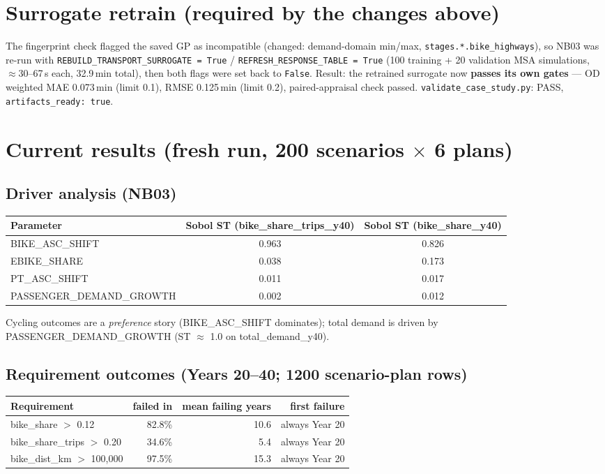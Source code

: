 \documentclass[10pt,a4paper]{article}
\begin{document}
\section{Surrogate retrain (required by the changes above)}
The fingerprint check flagged the saved GP as incompatible (changed: demand-domain
min/max, \texttt{stages.*.bike\_highways}), so NB03 was re-run with
\texttt{REBUILD\_TRANSPORT\_SURROGATE = True} / \texttt{REFRESH\_RESPONSE\_TABLE = True}
(100 training + 20 validation MSA simulations, $\approx$30--67\,s each, 32.9\,min total),
then both flags were set back to \texttt{False}. Result: the retrained surrogate now
\textbf{passes its own gates} --- OD weighted MAE 0.073\,min (limit 0.1), RMSE 0.125\,min
(limit 0.2), paired-appraisal check passed. \texttt{validate\_case\_study.py}: PASS,
\texttt{artifacts\_ready: true}.

\section{Current results (fresh run, 200 scenarios $\times$ 6 plans)}

\subsection{Driver analysis (NB03)}
\begin{center}\small\begin{tabular}{@{}lcc@{}}
\toprule
Parameter & Sobol ST (bike\_share\_trips\_y40) & Sobol ST (bike\_share\_y40) \\
\midrule
BIKE\_ASC\_SHIFT & 0.963 & 0.826 \\
EBIKE\_SHARE & 0.038 & 0.173 \\
PT\_ASC\_SHIFT & 0.011 & 0.017 \\
PASSENGER\_DEMAND\_GROWTH & 0.002 & 0.012 \\
\bottomrule
\end{tabular}\end{center}

Cycling outcomes are a \emph{preference} story (BIKE\_ASC\_SHIFT dominates); total demand
is driven by PASSENGER\_DEMAND\_GROWTH (ST $\approx$ 1.0 on total\_demand\_y40).

\subsection{Requirement outcomes (Years 20--40; 1200 scenario-plan rows)}
\begin{center}\small\begin{tabular}{@{}lrrr@{}}
\toprule
Requirement & failed in & mean failing years & first failure \\
\midrule
bike\_share ${>}$ 0.12 & 82.8\% & 10.6 & always Year 20 \\
bike\_share\_trips ${>}$ 0.20 & 34.6\% & 5.4 & always Year 20 \\
bike\_dist\_km ${>}$ 100{,}000 & 97.5\% & 15.3 & always Year 20 \\
\bottomrule
\end{tabular}\end{center}
\end{document}
